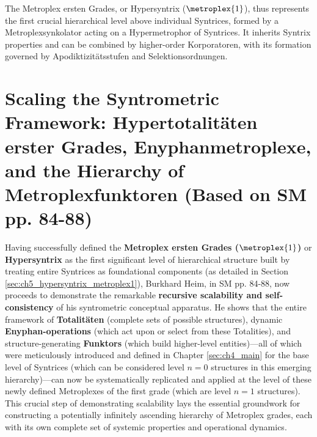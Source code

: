 \documentclass[
    12pt,              %
    a4paper,           %
    headings=normal,   %
    twoside=true,      %
    BCOR=8mm,          %
]{scrbook}
\newcommand{\hypersyntrix}{\metroplex{1}}
\begin{document}
The Metroplex ersten Grades, or Hypersyntrix (\(\hypersyntrix\)), thus represents the first crucial hierarchical level above individual Syntrices, formed by a Metroplexsynkolator acting on a Hypermetrophor of Syntrices. It inherits Syntrix properties and can be combined by higher-order Korporatoren, with its formation governed by Apodiktizitätsstufen and Selektionsordnungen.

\section{Scaling the Syntrometric Framework: Hypertotalitäten erster Grades, Enyphanmetroplexe, and the Hierarchy of Metroplexfunktoren (Based on SM pp. 84-88)}
\label{sec:ch5_scaling_framework}

Having successfully defined the \textbf{Metroplex ersten Grades (\(\hypersyntrix\))} or \textbf{Hypersyntrix} as the first significant level of hierarchical structure built by treating entire Syntrices as foundational components (as detailed in Section \ref{sec:ch5_hypersyntrix_metroplex1}), Burkhard Heim, in SM pp. 84-88, now proceeds to demonstrate the remarkable \textbf{recursive scalability and self-consistency} of his syntrometric conceptual apparatus. He shows that the entire framework of \textbf{Totalitäten} (complete sets of possible structures), dynamic \textbf{Enyphan-operations} (which act upon or select from these Totalities), and structure-generating \textbf{Funktors} (which build higher-level entities)—all of which were meticulously introduced and defined in Chapter \ref{sec:ch4_main} for the base level of Syntrices (which can be considered level \(n=0\) structures in this emerging hierarchy)—can now be systematically replicated and applied at the level of these newly defined Metroplexes of the first grade (which are level \(n=1\) structures). This crucial step of demonstrating scalability lays the essential groundwork for constructing a potentially infinitely ascending hierarchy of Metroplex grades, each with its own complete set of systemic properties and operational dynamics.
\end{document}
